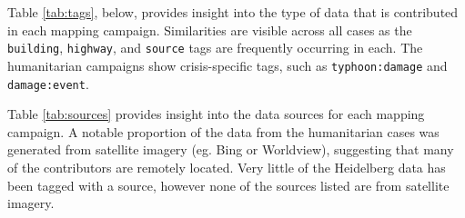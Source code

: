 Table \ref{tab:tags}, below, provides insight into the type of data that is contributed in each mapping campaign. Similarities are visible across all cases as the \texttt{building}, \texttt{highway}, and \texttt{source} tags are frequently occurring in each. The humanitarian campaigns show crisis-specific tags, such as \texttt{typhoon:damage} and \texttt{damage:event}.  

Table \ref{tab:sources} provides insight into the data sources for each mapping campaign. A notable proportion of the data from the humanitarian cases was generated from satellite imagery (eg. Bing or Worldview), suggesting that many of the contributors are remotely located. Very little of the Heidelberg data has been tagged with a source, however none of the sources listed are from satellite imagery. 

